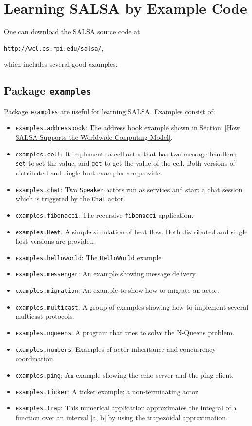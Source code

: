 \chapter{Learning SALSA by Example Code}\label{LearningSALSAEx}{
One can download the SALSA source code at
\begin{description}
\item {\tt http://wcl.cs.rpi.edu/salsa/}, 
\end{description}
which includes several good examples.

\section{Package {\tt examples}}
Package {\tt examples} are useful for learning SALSA. Examples consist of:
\begin{itemize}
\item {\tt examples.addressbook}: The address book example shown in 
Section~\ref{How SALSA Supports the Worldwide Computing Model}.
\item {\tt  examples.cell}: It implements a cell actor that has two message handlers: 
{\tt set} to set the value, and {\tt get} to get the value of the cell.  
Both versions of distributed and single host examples are provide.
\item {\tt examples.chat}: Two {\tt Speaker} actors run as services and start 
a chat session which is triggered by the {\tt Chat} actor.
\item {\tt examples.fibonacci}: The recursive {\tt fibonacci} application.
\item {\tt examples.Heat}: A simple simulation of heat flow. Both distributed and 
single host versions are provided.
\item {\tt examples.helloworld}: The {\tt HelloWorld} example.
\item {\tt examples.messenger}: An example showing message delivery.
\item {\tt examples.migration}: An example to show how to migrate an actor.
\item {\tt examples.multicast}: A group of examples showing how to implement several multicast protocols.
\item {\tt examples.nqueens}: A program that tries to solve the 
N-Queens problem.
\item {\tt examples.numbers}: Examples of actor inheritance and concurrency
coordination.
\item {\tt examples.ping}: An example showing the echo server and the ping client.
\item {\tt examples.ticker}: A ticker example: a non-terminating actor
\item {\tt examples.trap}: This numerical application approximates the integral of a function over 
an interval [a, b] by using the trapezoidal approximation.
\end{itemize}

}
